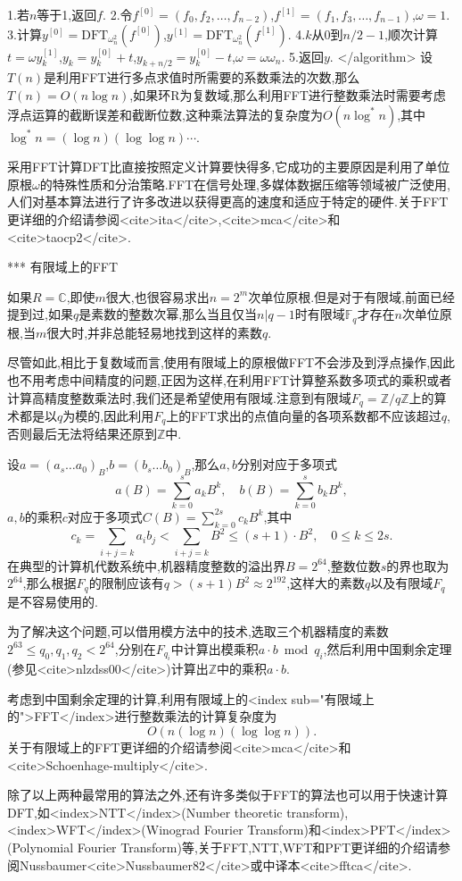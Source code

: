  1.若$n$等于1,返回$f$.
 2.令$f^{[0]}=(f_0,f_2,\ldots,f_{n-2})$,$f^{[ 1]}=(f_1,f_3,\ldots,f_{n-1})$,$\omega=1$.
 3.计算$y^{[0]}=\mathrm{DFT}_{\omega_n^2}(f^{[0]})$,$y^{[ 1]}=\mathrm{DFT}_{\omega_n^2}(f^{[ 1]})$.
 4.$k$从0到$n/2-1$,顺次计算$t=\omega y_k^{[ 1]}$,$y_k=y_k^{[0]}+t$,$y_{k+n/2}=y_k^{[0]}-t$,$\omega=\omega\omega_n$.
 5.返回$y$.
</algorithm>
设$T(n)$是利用FFT进行多点求值时所需要的系数乘法的次数,那么$T(n)=O(n\log{n})$,如果环R为复数域,那么利用FFT进行整数乘法时需要考虑浮点运算的截断误差和截断位数,这种乘法算法的复杂度为$O(n\log^*{n})$,其中$\log^*{n}=(\log{n})(\log{\log{n}})\cdots$.

采用FFT计算DFT比直接按照定义计算要快得多,它成功的主要原因是利用了单位原根$\omega$的特殊性质和分治策略.FFT在信号处理,多媒体数据压缩等领域被广泛使用,人们对基本算法进行了许多改进以获得更高的速度和适应于特定的硬件.关于FFT更详细的介绍请参阅<cite>ita</cite>,<cite>mca</cite>和<cite>taocp2</cite>.

*** 有限域上的FFT

如果$R=\mathbb{C}$,即使$m$很大,也很容易求出$n=2^m$次单位原根.但是对于有限域,前面已经提到过,如果$q$是素数的整数次幂,那么当且仅当$n|q-1$时有限域$\mathbb{F}_q$才存在$n$次单位原根,当$m$很大时,并非总能轻易地找到这样的素数$q$.

尽管如此,相比于复数域而言,使用有限域上的原根做FFT不会涉及到浮点操作,因此也不用考虑中间精度的问题,正因为这样,在利用FFT计算整系数多项式的乘积或者计算高精度整数乘法时,我们还是希望使用有限域.注意到有限域$F_q=\mathbb{Z}/q\mathbb{Z}$上的算术都是以$q$为模的,因此利用$F_q$上的FFT求出的点值向量的各项系数都不应该超过$q$,否则最后无法将结果还原到$\mathbb{Z}$中.

设$a=(a_s\ldots a_0)_B$,$b=(b_s\ldots b_0)_B$,那么$a,b$分别对应于多项式$$a(B)=\sum_{k=0}^sa_kB^k,\quad b(B)=\sum_{k=0}^sb_kB^k,$$
$a,b$的乘积$c$对应于多项式$C(B)=\sum\limits_{k=0}^{2s}c_kB^k$,其中$$c_k=\sum_{i+j=k}a_ib_j<\sum_{i+j=k}B^2\le(s+1)\cdot B^2,\quad 0\le k\le 2s.$$在典型的计算机代数系统中,机器精度整数的溢出界$B=2^{64}$,整数位数$s$的界也取为$2^{64}$,那么根据$F_q$的限制应该有$q>(s+1)B^2\approx 2^{192}$,这样大的素数$q$以及有限域$F_q$是不容易使用的.

为了解决这个问题,可以借用模方法中的技术,选取三个机器精度的素数$2^{63}\le q_0,q_1,q_2<2^{64}$,分别在$F_{q_i}$中计算出模乘积$a\cdot b\bmod q_i$,然后利用中国剩余定理(参见<cite>nlzdss00</cite>)计算出$\mathbb{Z}$中的乘积$a\cdot b$.

考虑到中国剩余定理的计算,利用有限域上的<index sub="有限域上的">FFT</index>进行整数乘法的计算复杂度为$$O(n(\log{n})(\log{\log{n}})).$$关于有限域上的FFT更详细的介绍请参阅<cite>mca</cite>和<cite>Schoenhage-multiply</cite>.

除了以上两种最常用的算法之外,还有许多类似于FFT的算法也可以用于快速计算DFT,如<index>NTT</index>(Number theoretic transform),<index>WFT</index>(Winograd Fourier Transform)和<index>PFT</index>(Polynomial Fourier Transform)等,关于FFT,NTT,WFT和PFT更详细的介绍请参阅Nussbaumer<cite>Nussbaumer82</cite>或中译本<cite>fftca</cite>.
